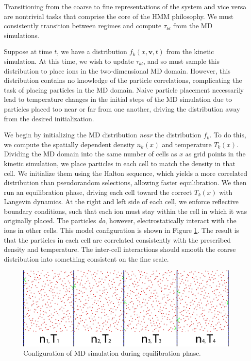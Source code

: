 \documentclass{article}
\begin{document}
Transitioning from the coarse to fine representations of the system and vice versa are nontrivial tasks that comprise the core of the HMM philosophy. We must consistently transition between regimes and compute $\tau_{kl}$ from the MD simulations.

Suppose at time $t$, we have a distribution $f_k(x,\mathbf{v},t)$ from the kinetic simulation. At this time, we wish to update $\tau_{kl}$, and so must sample this distribution to place ions in the two-dimensional MD domain. However, this distribution contains no knowledge of the particle correlations, complicating the task of placing particles in the MD domain. Naive particle placement necessarily lead to temperature changes in the initial steps of the MD simulation due to particles placed too near or far from one another, driving the distribution away from the desired initialization.

We begin by initializing the MD distribution \emph{near} the distribution $f_k$. To do this, we compute the spatially dependent density $n_k(x)$ and temperature $T_k(x)$. Dividing the MD domain into the same number of cells as $x$ as grid points in the kinetic simulation, we place particles in each cell to match the density in that cell. We initialize them using the Halton sequence, which yields a more correlated distribution than pseudorandom selections, allowing faster equilibration. We then run an equilibration phase, driving each cell toward the correct $T_k(x)$ with Langevin dynamics. At the right and left side of each cell, we enforce reflective boundary conditions, such that each ion must stay within the cell in which it was originally placed. The particles \emph{do}, however, electrostatically interact with the ions in other cells. This model configuration is shown in Figure \ref{MDequil}. The result is that the particles in each cell are correlated consistently with the prescribed density and temperature. The inter-cell interactions should smooth the coarse distribution into something consistent on the fine scale.
\begin{figure}[h]
    \includegraphics[width=0.8\linewidth]{equilibration.png}
	\caption{Configuration of MD simulation during equilibration phase.}
	\label{MDequil}
\end{figure}
\end{document}
